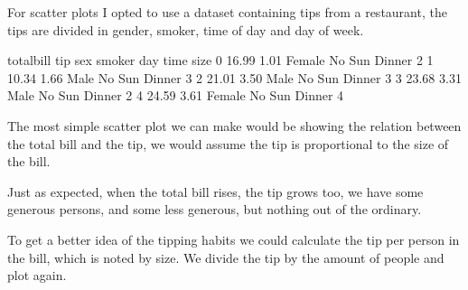 \documentclass[letterpaper,10pt,english]{jupyterBook}
\begin{document}
\sphinxAtStartPar
For scatter plots I opted to use a dataset containing tips from a restaurant, the tips are divided in gender, smoker, time of day and day of week.

\begin{sphinxVerbatim}[commandchars=\\\{\}]
  
\end{sphinxVerbatim}

\begin{sphinxVerbatim}[commandchars=\\\{\}]
   total\PYGZus{}bill   tip     sex smoker  day    time  size
0       16.99  1.01  Female     No  Sun  Dinner     2
1       10.34  1.66    Male     No  Sun  Dinner     3
2       21.01  3.50    Male     No  Sun  Dinner     3
3       23.68  3.31    Male     No  Sun  Dinner     2
4       24.59  3.61  Female     No  Sun  Dinner     4
\end{sphinxVerbatim}

\sphinxAtStartPar
The most simple scatter plot we can make would be showing the relation between the total bill and the tip, we would assume the tip is proportional to the size of the bill.

\begin{sphinxVerbatim}[commandchars=\\\{\}]
    
\end{sphinxVerbatim}

\noindent{}

\sphinxAtStartPar
Just as expected, when the total bill rises, the tip grows too, we have some generous persons, and some less generous, but nothing out of the ordinary.

\sphinxAtStartPar
To get a better idea of the tipping habits we could calculate the tip per person in the bill, which is noted by size.
We divide the tip by the amount of people and plot again.
\end{document}
